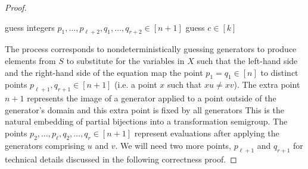 \documentclass{amsart}
\newcommand{\Model}{\mathrm{Model}}
\newcommand{\eq}{\ensuremath\mathrel{=}}
\newcommand{\NL}{\ensuremath\mathsf{NL}}
\newcommand{\co}{\ensuremath\mathsf{co}}
\theoremstyle{remark}
\numberwithin{equation}{section}
\begin{document}
\begin{proof}
  \begin{algorithm}
  \caption{$\co\NL$ algorithm for $\Model(u \eq v)$}
    \label{alg:models}
    \begin{algorithmic}[1]
      \Output{Does $\langle a_1,\dots,a_k,a_1^{-1},\dots,a_k^{-1} \rangle$ \emph{not} model $u \eq v$?}
      \State guess integers $p_1, \dots, p_{\ell+2}, q_1, \dots, q_{r+2} \in [n+1]$
        \Repeat
          \State guess $c \in [k]$
          \EndFor
          \EndFor
      \EndFor
      \State\Accept
    \end{algorithmic}
  \end{algorithm}

  The process corresponds to nondeterministically guessing generators to produce elements from $S$ to substitute for the variables in $X$ such that the left-hand side and the right-hand
  side of the equation map the point $p_1 = q_1 \in [n]$ to distinct points $p_{\ell+1},q_{r+1} \in [n+1]$ (i.e. a point $x$ such that $xu \neq xv$). The extra point $n+1$ represents the image of a generator applied to a point outside of the generator's domain and this extra point is fixed by all generators This is the natural embedding of partial bijections into a transformation semigroup. The points $p_2,\dots,p_\ell,q_2,\dots,q_r \in [n+1]$ represent evaluations after applying the generators comprising $u$ and $v$. We will need two more points, $p_{\ell+1}$ and $q_{r+1}$ for technical details discussed in the following correctness proof.
  

\end{proof}
\end{document}
